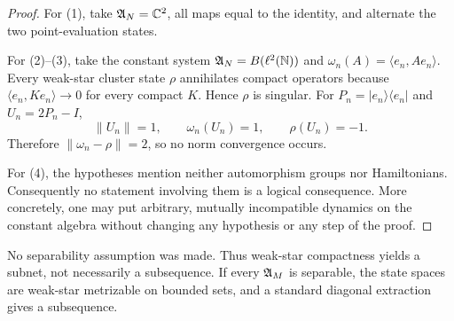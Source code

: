 \documentclass[11pt,a4paper]{article}
\begin{document}
\begin{proof}
For (1), take \(\mathfrak A_N=\mathbb C^2\), all maps equal to the identity, and alternate the two
point-evaluation states.

For (2)--(3), take the constant system \(\mathfrak A_N=B(\ell^2(\mathbb N))\) and
\(\omega_n(A)=\langle e_n,Ae_n\rangle\).  Every weak-star cluster state \(\rho\)
annihilates compact operators because
\(\langle e_n,Ke_n\rangle\to0\) for every compact \(K\).  Hence \(\rho\) is
singular.  For \(P_n=|e_n\rangle\langle e_n|\) and
\(U_n=2P_n-I\),
\[
 \|U_n\|=1,\qquad \omega_n(U_n)=1,\qquad \rho(U_n)=-1.          \tag{5.1}
\]
Therefore \(\|\omega_n-\rho\|=2\), so no norm convergence occurs.

For (4), the hypotheses mention neither automorphism groups nor Hamiltonians.
Consequently no statement involving them is a logical consequence.  More concretely,
one may put arbitrary, mutually incompatible dynamics on the constant algebra without
changing any hypothesis or any step of the proof.
\end{proof}

\begin{remark}
No separability assumption was made.  Thus weak-star compactness yields a subnet, not
necessarily a subsequence.  If every \(\mathfrak A_M\) is separable, the state spaces are
weak-star metrizable on bounded sets, and a standard diagonal extraction gives a
subsequence.
\end{remark}
\end{document}
